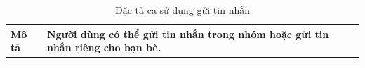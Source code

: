 \begin{longtable}{| p{4cm} | p{\dimexpr\linewidth-4cm-4\tabcolsep} |} %
    \caption{Đặc tả ca sử dụng gửi tin nhắn} %
    \label{tab:uc_send_message_spec} \\ %

    \hline
    \textbf{Mô tả} & Người dùng có thể gửi tin nhắn trong nhóm hoặc gửi tin nhắn riêng cho bạn bè. \\
    \hline
    \endfirsthead %



    \hline %
    \endlastfoot


\end{longtable}
